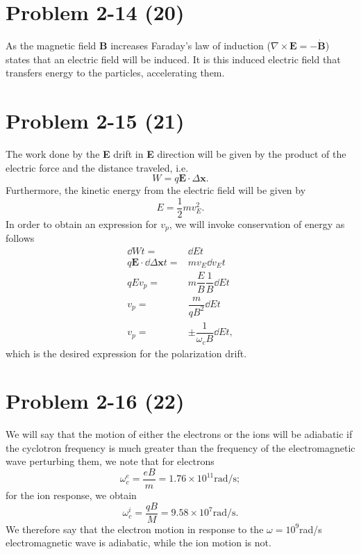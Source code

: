 \section*{Problem 2-14 (20)}
\label{sec:2-14}
As the magnetic field \textbf{B} increases Faraday's law of induction (\(\nabla \times \textbf{E} = -\dot{\textbf{B}} \)) states that an electric field will be induced. It is this induced electric field that transfers energy to the particles, accelerating them. 

\section*{Problem 2-15 (21)}
\label{sec:2-15}
The work done by the \textbf{E} drift in \textbf{E} direction will be given by the product of the electric force and the distance traveled, i.e.
\begin{equation*}
	W = q\textbf{E}\cdot\Delta\textbf{x}.
\end{equation*}
Furthermore, the kinetic energy from the electric field will be given by
\begin{equation*}
	E = \dfrac{1}{2}mv_E^2.
\end{equation*}
In order to obtain an expression for \(v_p\), we will invoke conservation of energy as follows
\begin{align*}
	\dd{W}{t} =& \dd{E}{t}\\
	q\textbf{E}\cdot\dd{\Delta\textbf{x}}{t} =& mv_E\dd{v_E}{t} \\
	qEv_p =& m\dfrac{E}{B}\dfrac{1}{B}\dd{E}{t} \\
	v_p =& \dfrac{m}{qB^2}\dd{E}{t} \\
	v_p =& \pm\dfrac{1}{\omega_cB}\dd{E}{t},
\end{align*}
which is the desired expression for the polarization drift.

\section*{Problem 2-16 (22)}
\label{sec:2-16}
We will say that the motion of either the electrons or the ions will be adiabatic if the cyclotron frequency is much greater than the frequency of the electromagnetic wave perturbing them, we note that for electrons
\begin{equation*}
	\omega_c^e = \dfrac{eB}{m} = 1.76 \times 10^{11} \text{rad/s};
\end{equation*}
for the ion response, we obtain
\begin{equation*}
	\omega_c^i = \dfrac{qB}{M} = 9.58 \times 10^{7} \text{rad/s}.
\end{equation*}
We therefore say that the electron motion in response to the \(\omega = 10^9\)rad/s electromagnetic wave is adiabatic, while the ion motion is not.

